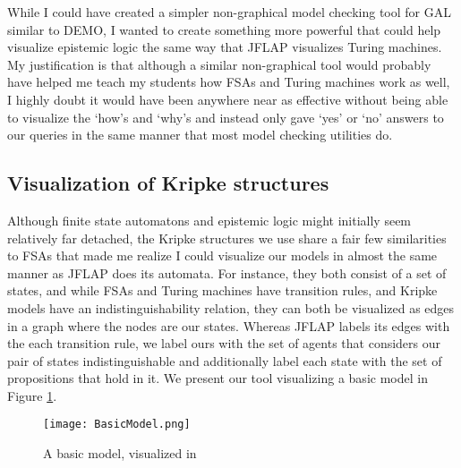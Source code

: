 
While I could have created a simpler non-graphical model checking tool for GAL similar to DEMO, I wanted to create something more powerful that could help visualize epistemic logic the same way that JFLAP visualizes Turing machines. My justification is that although a similar non-graphical tool would probably have helped me teach my students how FSAs and Turing machines work as well, I highly doubt it would have been anywhere near as effective without being able to visualize the `how's and `why's and instead only gave `yes' or `no' answers to our queries in the same manner that most model checking utilities do. 

\subsection{Visualization of Kripke structures}
Although finite state automatons and epistemic logic might initially seem relatively far detached, the Kripke structures we use share a fair few similarities to FSAs that made me realize I could visualize our models in almost the same manner as JFLAP does its automata. For instance, they both consist of a set of states, and while FSAs and Turing machines have transition rules, and Kripke models have an indistinguishability relation, they can both be visualized as edges in a graph where the nodes are our states. Whereas JFLAP labels its edges with the each transition rule, we label ours with the set of agents that considers our pair of states indistinguishable and additionally label each state with the set of propositions that hold in it. We present our tool visualizing a basic model in Figure \ref{fig:basicModelVis}.


\begin{figure}[H]
	\texttt{[image: BasicModel.png]}
	\caption{A basic model, visualized in \cname}
	\label{fig:basicModelVis}
\end{figure} 

